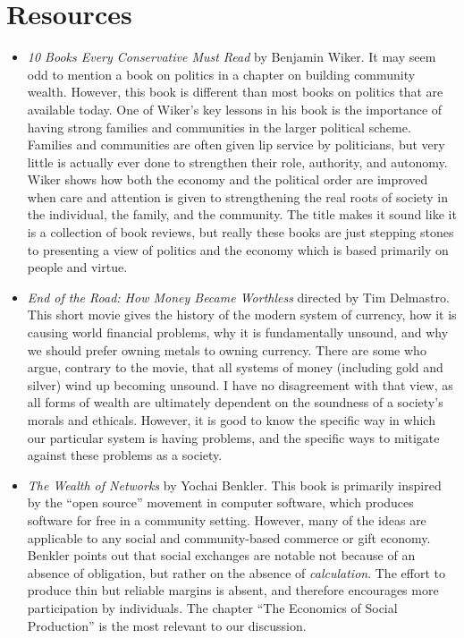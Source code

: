 \section{Resources}
\begin{itemize}
\item
\textit{10 Books Every Conservative Must Read} by Benjamin Wiker.  It may seem odd to mention a book
on politics in a chapter on building community wealth.  However, this book is different than most
books on politics that are available today.  One of Wiker's key lessons in his book is the importance
of having strong families and communities in the larger political scheme.  Families and communities 
are often given lip service by politicians, but very little is actually ever done to strengthen their
role, authority, and autonomy.  Wiker shows how both the economy and the political order are improved
when care and attention is given to strengthening the real roots of society in the individual, the
family, and the community.  The title makes it sound like it is a collection of book reviews, but really
these books are just stepping stones to presenting a view of politics and the economy which is based
primarily on people and virtue.
\item
\textit{End of the Road: How Money Became Worthless} directed by Tim Delmastro.  This short movie
gives the history of the modern system of currency, how it is causing world financial problems,
why it is fundamentally unsound, and why we should prefer owning metals to owning currency.  
There are some who argue, contrary to the movie, that all systems 
of money (including gold and silver) wind up becoming unsound.  I have no disagreement with that view,
as all forms of wealth are ultimately dependent on the soundness of a society's morals and ethicals.
However, it is good to know the specific way in which our particular system is having problems, and
the specific ways to mitigate against these problems as a society.
\item
\textit{The Wealth of Networks} by Yochai Benkler.  This book is primarily inspired by the ``open source'' movement
in computer software, which produces software for free in a community setting.  However, many of the ideas
are applicable to any social and community-based commerce or gift economy.  Benkler points out that social
exchanges are notable not because of an absence of obligation, but rather on the absence of \textit{calculation}.
The effort to produce thin but reliable margins is absent, and therefore encourages more participation by
individuals.  The chapter ``The Economics of Social Production'' is the most relevant to our discussion.
\end{itemize}
